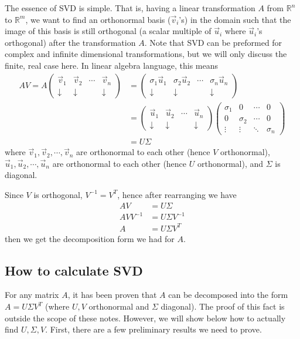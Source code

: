 \documentclass{article}
\begin{document}
The essence of SVD is simple. That is, having a linear transformation $A$ from $\mathbb{R}^n$ to $\mathbb{R}^m$, we want to find an orthonormal basis ($\vec{v}_i$'s) in the domain such that the image of this basis is still orthogonal (a scalar multiple of $\vec{u}_i$ where $\vec{u}_i$'s orthogonal) after the transformation $A$. Note that SVD can be preformed for complex and infinite dimensional transformations, but we will only discuss the finite, real case here. In linear algebra language, this means 
\begin{align*}
AV =A \begin{pmatrix} \vec{v}_1 & \vec{v}_2 & \cdots & \vec{v}_n  \\ \downarrow & \downarrow & &\downarrow \end{pmatrix} &= \begin{pmatrix} \sigma_1 \vec{u}_1 & \sigma_2 \vec{u}_2 & \cdots &\sigma_n \vec{u}_n  \\ \downarrow & \downarrow & &\downarrow \end{pmatrix} \\
&= \begin{pmatrix} \vec{u}_1 & \vec{u}_2 & \cdots & \vec{u}_n  \\ \downarrow & \downarrow & &\downarrow \end{pmatrix} \begin{pmatrix} \sigma_1 & 0 & \cdots & 0 \\ 0& \sigma_2 & \cdots & 0 \\ \vdots & \vdots & \ddots & \sigma_n \end{pmatrix} \\
&= U \Sigma
\end{align*}
where $\vec{v}_1, \vec{v}_2, \cdots, \vec{v}_n$ are orthonormal to each other (hence $V$ orthonormal), $\vec{u}_1, \vec{u}_2, \cdots, \vec{u}_n$ are orthonormal to each other (hence $U$ orthonormal), and $\Sigma$ is diagonal.

Since $V$ is orthogonal, $V^{-1} = V^T$, hence after rearranging we have
\begin{align*}
AV &= U \Sigma \\
AV V^{-1} &= U \Sigma V^{-1} \\
A &= U\Sigma V^T
\end{align*}
then we get the decomposition form we had for $A$.

\subsection{How to calculate SVD}
For any matrix $A$, it has been proven that $A$ can be decomposed into the form $A = U \Sigma V^T$ (where $U,V$ orthonormal and $\Sigma$ diagonal). The proof of this fact is outside the scope of these notes. However, we will show below how to actually find $U, \Sigma, V$. First, there are a few preliminary results we need to prove.
\bigskip
\end{document}
